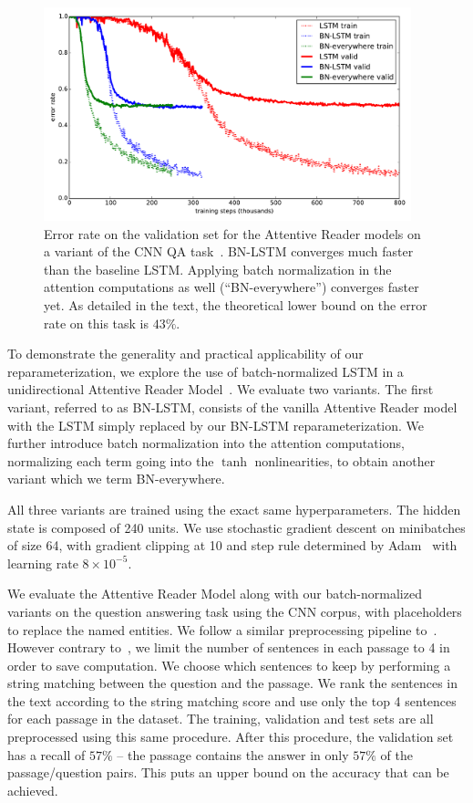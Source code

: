 \documentclass{article} %
\begin{document}
\begin{figure}
\center
\includegraphics[width=0.95\textwidth]{figures/attr_valid.pdf}
\caption{
Error rate on the validation set for the Attentive Reader models on a variant of the CNN QA task~\cite{attentivereader}.
BN-LSTM converges much faster than the baseline LSTM.
Applying batch normalization in the attention computations as well (``BN-everywhere'') converges faster yet.
As detailed in the text, the theoretical lower bound on the error rate on this task is $43\%$.
}
\label{fig:attr_valid}
\end{figure}

To demonstrate the generality and practical applicability of our reparameterization,
we explore the use of batch-normalized LSTM in a unidirectional Attentive Reader Model~\cite{attentivereader}.
We evaluate two variants.
The first variant, referred to as BN-LSTM, consists of the vanilla Attentive Reader model with the LSTM simply replaced by our BN-LSTM reparameterization.
We further introduce batch normalization into the attention computations, normalizing each term going into the $\tanh$ nonlinearities, to obtain another variant which we term BN-everywhere.

All three variants are trained using the exact same hyperparameters.
The hidden state is composed of 240 units.
We use stochastic gradient descent on minibatches of size 64,
with gradient clipping at 10 and step rule determined by Adam~\cite{kingma2014adam}
with learning rate $8 \times 10^{-5}$.

We evaluate the Attentive Reader Model along with our batch-normalized variants on the question answering task using the CNN corpus, with placeholders to replace the named entities. We follow a similar preprocessing pipeline to~\cite{attentivereader}.
However contrary to~\cite{attentivereader}, we limit the number of sentences in each passage to 4 in order to save computation.
We choose which sentences to keep by performing a string matching between the question and the passage.
We rank the sentences in the text according to the string matching score and use only the top 4 sentences for each passage in the dataset.
The training, validation and test sets are all preprocessed using this same procedure.
After this procedure, the validation set has a recall of $57\%$ -- the passage contains the answer in only $57\%$ of the passage/question pairs.
This puts an upper bound on the accuracy that can be achieved.
\end{document}
